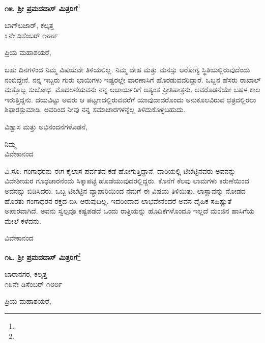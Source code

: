 \begin{center}
\textbf{೧೫. ಶ‍್ರೀ ಪ್ರಮದದಾಸ್ ಮಿತ್ರರಿಗೆ}\footnote{}
\end{center}

\vspace{-0.8cm}

\begin{flushright}
ಬಾಗ್‌ಬಜಾರ್, ಕಲ್ಕತ್ತ\\೩ನೇ ಡಿಸೆಂಬರ್ ೧೮೮೯
\end{flushright}
\vspace{-0.5cm}

\noindent
ಪ್ರಿಯ ಮಹಾಶಯರೆ,

ಬಹು ದಿನಗಳಿಂದ ನಿಮ್ಮ ವಿಷಯವೇ ತಿಳಿಯಲಿಲ್ಲ. ನಿಮ್ಮ ದೇಹ ಮತ್ತು ಮನಸ್ಸು ಆರೋಗ್ಯ ಸ್ಥಿತಿಯಲ್ಲಿರುವುದೆಂದು ನಂಬಿದ್ದೇನೆ. ನನ್ನ ಇಬ್ಬರು ಗುರು ಭಾಯಿಗಳು ಇಷ್ಟರಲ್ಲೇ ವಾರಣಾಸಿಗೆ ಹೊರಡುವವರಿದ್ದಾರೆ. ಒಬ್ಬನ ಹೆಸರು ರಾಖಾಲ್ ಮತ್ತೊಬ್ಬ ಸುಬೋಧ. ಮೊದಲನೆಯವನು ನನ್ನ ಆಚಾರ್ಯರಿಗೆ ಅತ್ಯಂತ ಪ್ರೀತಿಪಾತ್ರನು. ಅವರೊಡನೆಯೇ ಬಹಳ ಕಾಲ ಇರುತ್ತಿದ್ದನು. ದಯವಿಟ್ಟು ಅವರು ಆ ಪಟ್ಟಣದಲ್ಲಿರುವವರೆಗೆ ಯಾವುದಾದರೊಂದು ಅನುಕೂಲವಿರುವ ಛತ್ರದಲ್ಲಿರಲು ಶಿಫಾರಸ್ಸುಮಾಡಿ. ಅವರಿಂದ ನೀವು ನನ್ನ ಸಮಾಚಾರಗಳನ್ನೆಲ್ಲ ತಿಳಿದುಕೊಳ್ಳಬಹುದು.

\newpage

ವಿಶ್ವಾಸ ಮತ್ತು ಅಭಿನಂದನೆಗಳೊಡನೆ,
\vspace{-0.3cm}

{\flushright
ನಿಮ್ಮ\\ವಿವೇಕಾನಂದ\par}

ವಿ.ಸೂ: ಗಂಗಾಧರನು ಈಗ ಕೈಲಾಸ ಪರ್ವತದ ಕಡೆ ಹೋಗುತ್ತಿದ್ದಾನೆ. ದಾರಿಯಲ್ಲಿ ಟಿಬೆಟ್ಟಿನವರು ಅವನನ್ನು ವಿದೇಶೀಯರ ಗೂಢಚಾರನೆಂದು ಸಿಕ್ಕಾಪಟ್ಟೆ ಹೊಡೆಯುವುದರಲ್ಲಿದ್ದರು. ಕೊನೆಗೆ ಕೆಲವು ಲಾಮಗಳು ಕರುಣೆಯಿಂದ ಅವನನ್ನು ಬಿಡಿಸಿದರು. ಒಬ್ಬ ಟಿಬೆಟ್ಟಿನ ವ್ಯಾಪಾರಿಯಿಂದ ನಮಗೆ ಈ ವಿಷಯ ತಿಳಿಯಿತು. ಲಾಸ್ಹಾವನ್ನು ನೋಡದ ಹೊರತು ಗಂಗಾಧರನ ರಕ್ತದ ಬಿಸಿ ಆರುವುದಿಲ್ಲ. ಇದರಿಂದಾದ ಲಾಭವೇನೆಂದರೆ ಅವನ ದೈಹಿಕ ಸಹಿಷ್ಣುತೆ ಅಪಾರವಾಗಿದೆ. ಅವನು ಸ್ವಲ್ಪವೂ ಕಷ್ಟಪಡದೆ ಒಂದು ರಾತ್ರಿಯನ್ನು ಹೊದಿಕೆಗಳೊಂದೂ ಇಲ್ಲದೆ ಮಂಜಿನ ಹಾಸಿಗೆಯ ಮೇಲೆ ಕಳೆದನು.

{\flushright
ವಿವೇಕಾನಂದ\par}

\begin{center}
\textbf{೧೬. ಶ‍್ರೀ ಪ್ರಮದದಾಸ್ ಮಿತ್ರರಿಗೆ}\footnote{}
\end{center}

\begin{flushright}
ಬಾರಾನಗರ, ಕಲ್ಕತ್ತ\\೧೩ನೇ ಡಿಸೆಂಬರ್ ೧೮೮೯
\end{flushright}

\noindent
ಪ್ರಿಯ ಮಹಾಶಯರೆ,

